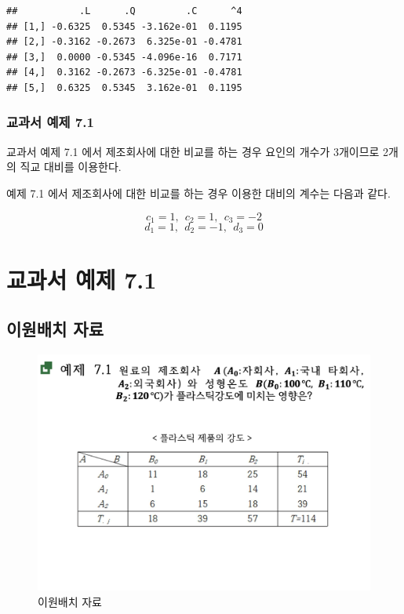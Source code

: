 \documentclass[
]{book}
\begin{document}
\begin{verbatim}
##           .L      .Q         .C      ^4
## [1,] -0.6325  0.5345 -3.162e-01  0.1195
## [2,] -0.3162 -0.2673  6.325e-01 -0.4781
## [3,]  0.0000 -0.5345 -4.096e-16  0.7171
## [4,]  0.3162 -0.2673 -6.325e-01 -0.4781
## [5,]  0.6325  0.5345  3.162e-01  0.1195
\end{verbatim}

\hypertarget{uxad50uxacfcuxc11c-uxc608uxc81c-7.1}{%
\subsection{교과서 예제 7.1}\label{uxad50uxacfcuxc11c-uxc608uxc81c-7.1}}

교과서 예제 7.1 에서 제조회사에 대한 비교를 하는 경우 요인의 개수가 3개이므로 2개의 직교 대비를 이용한다.

예제 7.1 에서 제조회사에 대한 비교를 하는 경우 이용한 대비의 계수는 다음과 같다.

\[ c_1= 1, ~~ c_2=1, ~~ c_3 = -2 \]
\[ d_1= 1, ~~d_2=-1, ~~ d_3= 0 \]

\hypertarget{ex71}{%
\chapter{교과서 예제 7.1}\label{ex71}}

\hypertarget{uxc774uxc6d0uxbc30uxce58-uxc790uxb8cc}{%
\section{이원배치 자료}\label{uxc774uxc6d0uxbc30uxce58-uxc790uxb8cc}}

\begin{figure}
\centering
\includegraphics{slide01.png}
\caption{이원배치 자료}
\end{figure}
\end{document}
